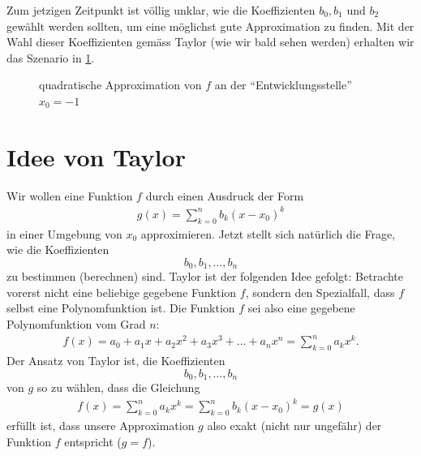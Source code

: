 Zum jetzigen Zeitpunkt ist völlig unklar, wie die Koeffizienten $b_0, b_1$ und $b_2$ gewählt werden sollten, um eine möglichst gute Approximation zu finden. Mit der Wahl dieser Koeffizienten gemäss Taylor (wie wir bald sehen werden) erhalten wir das Szenario in \cref{fig:Taylor2}.   
\begin{figure}[H]
  \begin{center}
  \end{center}
  \caption{quadratische Approximation von $f$ an der \enquote{Entwicklungsstelle} $x_0 = -1$}\label{fig:Taylor2}
\end{figure}


\section{Idee von Taylor}
Wir wollen eine Funktion $f$ durch einen Ausdruck der Form
\begin{align*}
  g(x) = \sum_{k=0}^n b_k(x-x_0)^k
\end{align*}
in einer Umgebung von $x_0$ approximieren. Jetzt stellt sich natürlich die Frage, wie die Koeffizienten
\[b_0, b_1, \ldots, b_n\]
zu bestimmen (berechnen) sind.  Taylor ist der folgenden Idee gefolgt: Betrachte vorerst nicht eine beliebige gegebene Funktion $f$, sondern den Spezialfall, dass $f$ selbst eine Polynomfunktion ist. Die Funktion $f$ sei also eine gegebene Polynomfunktion vom Grad $n$:
\begin{align*}
  f(x) = a_0 + a_1x + a_2x^2 + a_3x^3 + \ldots + a_nx^n = \sum_{k=0}^n a_kx^k.
\end{align*}
Der Ansatz von Taylor ist, die Koeffizienten
\[b_0, b_1, \ldots, b_n\]
von $g$ so zu wählen, dass die Gleichung
\begin{align}
   f(x) = \sum_{k=0}^n a_kx^k = \sum_{k=0}^n b_k(x-x_0)^k = g(x)
\end{align}
erfüllt ist, dass unsere Approximation $g$ also exakt (nicht nur ungefähr) der Funktion $f$ entspricht ($g = f$). 

